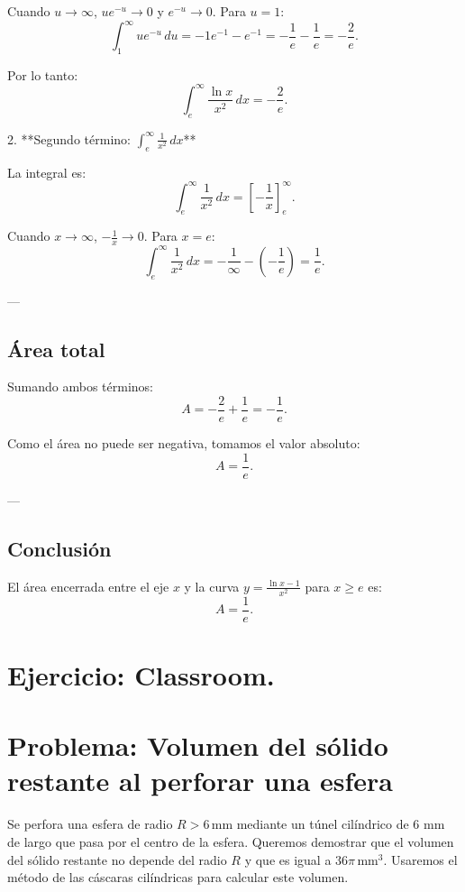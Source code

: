 \documentclass[11pt,letterpaper]{article}
\begin{document}
Cuando \(u \to \infty\), \(u e^{-u} \to 0\) y \(e^{-u} \to 0\). Para \(u = 1\):
\[
\int_{1}^{\infty} u e^{-u} \, du = -1 e^{-1} - e^{-1} = -\frac{1}{e} - \frac{1}{e} = -\frac{2}{e}.
\]

Por lo tanto:
\[
\int_{e}^{\infty} \frac{\ln x}{x^2} \, dx = -\frac{2}{e}.
\]

2. **Segundo término: \(\int_{e}^{\infty} \frac{1}{x^2} \, dx\)**

La integral es:
\[
\int_{e}^{\infty} \frac{1}{x^2} \, dx = \left[ -\frac{1}{x} \right]_{e}^{\infty}.
\]

Cuando \(x \to \infty\), \(-\frac{1}{x} \to 0\). Para \(x = e\):
\[
\int_{e}^{\infty} \frac{1}{x^2} \, dx = -\frac{1}{\infty} - \left(-\frac{1}{e}\right) = \frac{1}{e}.
\]

---

\subsection*{Área total}

Sumando ambos términos:
\[
A = -\frac{2}{e} + \frac{1}{e} = -\frac{1}{e}.
\]

Como el área no puede ser negativa, tomamos el valor absoluto:
\[
A = \frac{1}{e}.
\]

---

\subsection*{Conclusión}

El área encerrada entre el eje \(x\) y la curva \(y = \frac{\ln x - 1}{x^2}\) para \(x \geq e\) es:
\[
A = \frac{1}{e}.
\]

\section{Ejercicio: Classroom.}
\section*{Problema: Volumen del sólido restante al perforar una esfera}

Se perfora una esfera de radio \( R > 6 \, \mathrm{mm} \) mediante un túnel cilíndrico de 6 mm de largo que pasa por el centro de la esfera. Queremos demostrar que el volumen del sólido restante no depende del radio \( R \) y que es igual a \( 36\pi \, \mathrm{mm}^3 \). Usaremos el método de las cáscaras cilíndricas para calcular este volumen.
\end{document}
